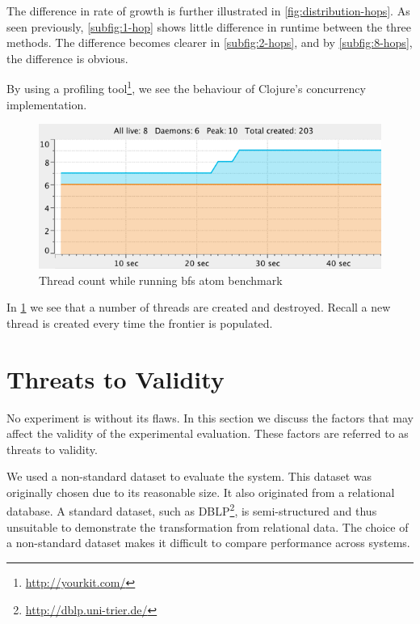 				The difference in rate of growth is further illustrated in \cref{fig:distribution-hops}.  As seen previously, \cref{subfig:1-hop} shows little difference in runtime between the three methods.  The difference becomes clearer in \cref{subfig:2-hops}, and by \cref{subfig:8-hops}, the difference is obvious.
				
				By using a profiling tool\footnote{\url{http://yourkit.com/}}, we see the behaviour of Clojure's concurrency implementation.
				
				\begin{figure}
					\centering
					
					\includegraphics{figures/images/threads}
					
					\caption{Thread count while running \gls{bfs} atom benchmark}
					\label{fig:runtime-threads}
				\end{figure}
				
				In \cref{fig:runtime-threads} we see that a number of threads are created and destroyed.  Recall a new thread is created every time the frontier is populated.
	
	\section{Threats to Validity}
	\label{sec:threats-to-validity}
		No experiment is without its flaws.  In this section we discuss the factors that may affect the validity of the experimental evaluation.  These factors are referred to as threats to validity.
		
		We used a non-standard dataset to evaluate the system.  This dataset was originally chosen due to its reasonable size.  It also originated from a relational database.  A standard dataset, such as DBLP\footnote{\url{http://dblp.uni-trier.de/}}, is semi-structured and thus unsuitable to demonstrate the transformation from relational data.  The choice of a non-standard dataset makes it difficult to compare performance across systems.
		
